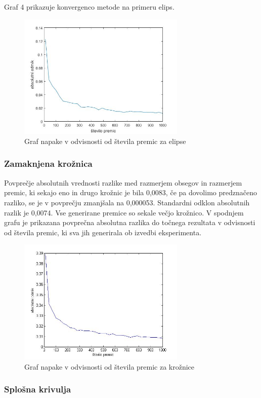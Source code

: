\documentclass[a4paper]{article}
\begin{document}
Graf 4 prikazuje konvergenco metode na primeru elips.

\begin{figure}[h]
\centering
\includegraphics[width=80mm]{graf_elipsa2.jpg}
\caption{Graf napake v odvisnosti od števila premic za elipse \label{overflow}}
\end{figure} 

\subsubsection{Zamaknjena krožnica}

Povprečje absolutnih vrednosti razlike med razmerjem obsegov in razmerjem premic, ki sekajo eno in drugo krožnic je bila 0,0083, če pa dovolimo predznačeno razliko, se je v povprečju zmanjšala na 0,000053. Standardni odklon absolutnih razlik je 0,0074. Vse generirane premice so sekale večjo krožnico. V spodnjem grafu je prikazana povprečna absolutna razlika do točnega rezultata v odvisnosti od števila premic, ki sva jih generirala ob izvedbi eksperimenta.

\begin{figure}[h]
\centering
\includegraphics[width=80mm]{graf_kroznica.jpg}
\caption{Graf napake v odvisnosti od števila premic za krožnice \label{overflow}}
\end{figure} 


\subsubsection{Splošna krivulja}
\end{document}
